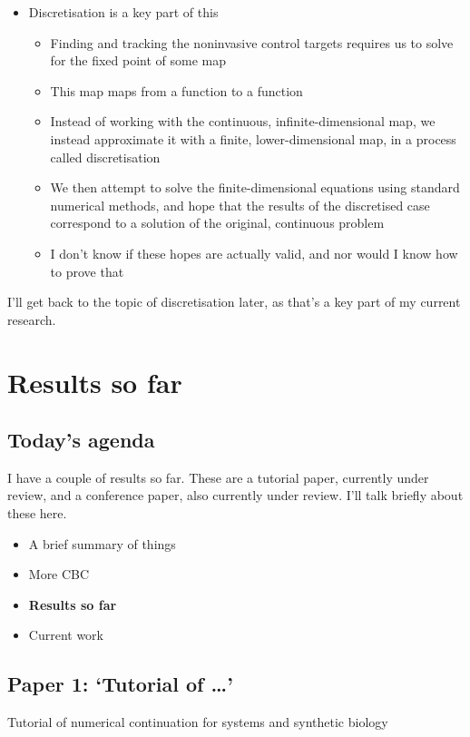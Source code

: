 \documentclass[11pt]{article}
\begin{document}
\begin{itemize}
\item Discretisation is a key part of this
\begin{itemize}
\item Finding and tracking the noninvasive control targets requires us to solve for the fixed point of some map
\item This map maps from a function to a function
\item Instead of working with the continuous, infinite-dimensional map, we instead approximate it with a finite, lower-dimensional map, in a process called discretisation
\item We then attempt to solve the finite-dimensional equations using standard numerical methods, and hope that the results of the discretised case correspond to a solution of the original, continuous problem
\item I don't know if these hopes are actually valid, and nor would I know how to prove that
\end{itemize}
\end{itemize}

I'll get back to the topic of discretisation later, as that's a key part of my current research.

\section{Results so far}
\label{sec:org2e0036c}
\subsection{Today's agenda}
\label{sec:org75eaf77}

I have a couple of results so far.
These are a tutorial paper, currently under review, and a conference paper, also currently under review.
I'll talk briefly about these here.

\begin{itemize}
\item A brief summary of things

\item More CBC

\item \textbf{Results so far}

\item Current work
\end{itemize}



\subsection{Paper 1: `Tutorial of \dots{}'}
\label{sec:org3a79022}
\begin{center}
Tutorial of numerical continuation for systems and synthetic biology
\end{center}
\end{document}
